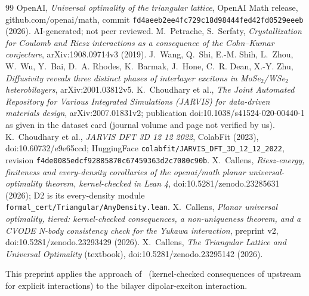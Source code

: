 \documentclass[11pt]{article}
\theoremstyle{remark}
\begin{document}
\begin{thebibliography}{99}\small
{} OpenAI, \emph{Universal optimality of the triangular lattice}, OpenAI Math release, github.com/openai/math,
commit \texttt{fd4aeeb2ee4fc729c18d98444fed42fd0529eeeb} (2026). AI-generated; not peer reviewed.
 M.~Petrache, S.~Serfaty, \emph{Crystallization for Coulomb and Riesz interactions as a consequence of the
Cohn--Kumar conjecture}, arXiv:1908.09714v3 (2019).
 J.~Wang, Q.~Shi, E.-M. Shih, L.~Zhou, W.~Wu, Y.~Bai, D.~A. Rhodes, K.~Barmak, J.~Hone, C.~R. Dean,
X.-Y. Zhu, \emph{Diffusivity reveals three distinct phases of interlayer excitons in MoSe$_2$/WSe$_2$ heterobilayers},
arXiv:2001.03812v5.
 K.~Choudhary et al., \emph{The Joint Automated Repository for Various Integrated Simulations (JARVIS) for
data-driven materials design}, arXiv:2007.01831v2; publication doi:10.1038/s41524-020-00440-1 as given in the dataset
card (journal volume and page not verified by us).
 K.~Choudhary et al., \emph{JARVIS DFT 3D 12 12 2022}, ColabFit (2023), doi:10.60732/e9e65ccd;
HuggingFace \texttt{colabfit/JARVIS\_DFT\_3D\_12\_12\_2022}, revision \texttt{f4de0085edcf92885870c67459363d2c7080c90b}.
 X.~Callens, \emph{Riesz-energy, finiteness and every-density corollaries of the openai/math planar
universal-optimality theorem, kernel-checked in Lean 4}, doi:10.5281/zenodo.23285631 (2026); D2 is its every-density
module \texttt{formal\_cert/Triangular/AnyDensity.lean}.
 X.~Callens, \emph{Planar universal optimality, tiered: kernel-checked consequences, a non-uniqueness
theorem, and a CVODE N-body consistency check for the Yukawa interaction}, preprint v2, doi:10.5281/zenodo.23293429 (2026).
 X.~Callens, \emph{The Triangular Lattice and Universal Optimality} (textbook), doi:10.5281/zenodo.23295142 (2026).
\end{thebibliography}
\noindent This preprint applies the approach of~\cite{uot,txt} (kernel-checked consequences of upstream for explicit
interactions) to the bilayer dipolar-exciton interaction.
\end{document}
